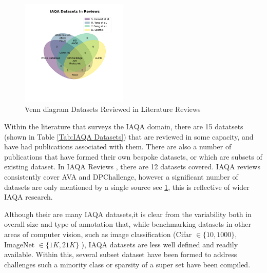 \begin{figure}
\specialrule{0.01em}{0.2em}{0.2em}
     \begin{center}
     \includegraphics[width=0.45\textwidth]{figures/data_plots/datasets.png}    
     \caption{\label{fig:Data_venn} Venn diagram Datasets Reviewed in Literature Reviews}
     \label{fig:venn}
  \specialrule{0.01em}{0.2em}{0.2em}
  \end{center}
\end{figure}
Within the literature that surveys the IAQA domain, there are 15 datatsets (shown in Table \ref{Tab:IAQA Datasets}) that are reviewed in some capacity, and have had publications associated with them. There are also a number of publications that have formed their own bespoke datasets, or which are subsets of existing dataset. In IAQA Reviews \cite{Yang2019,Kanwal2021,Spathis2016,Deng2017}, there are 12 datasets covered. IAQA reviews consistently cover AVA and DPChallenge, however a significant number of datasets are only mentioned by a single source see \ref{fig:venn}, this is reflective of wider IAQA research. \par

Although their are many IAQA datasets,it is clear from the variability both in overall size and type of annotation that, while benchmarking datasets in other areas of computer vision, such as image classification (Cifar $\in\{10, 1000\}$\cite{Krizhevsky2009,Krizhevsky2009a}, ImageNet\cite{Deng2009} $\in \{1K,21K\}$ ), IAQA datasets  are less well defined and readily available. Within this, several subset dataset have been formed to address challenges such a minority class or sparsity of a super set have been compiled. 

